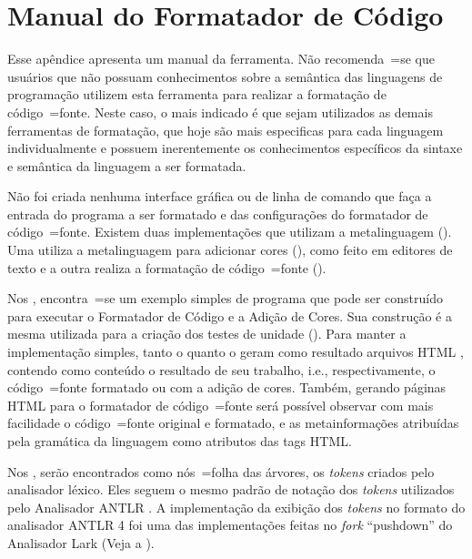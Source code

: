 

\chapter[Manual do Formatador]{Manual do Formatador de Código}
\label{chapter:manualDoFormatadorDeCodigo}

Esse apêndice apresenta um manual da ferramenta.
Não recomenda~=se que usuários que não possuam conhecimentos sobre a semântica das linguagens de programação\advisor{}{,
} utilizem esta ferramenta para realizar a formatação de código~=fonte.
Neste caso,
o mais indicado é que sejam utilizados as demais ferramentas de formatação,
que hoje são mais especificas para cada linguagem individualmente e
possuem inerentemente os conhecimentos específicos da sintaxe e
semântica da linguagem a ser formatada.

Não foi criada nenhuma interface gráfica ou
de linha de comando que faça a entrada do programa a ser formatado e
das configurações do formatador de código~=fonte.
Existem duas implementações que utilizam a metalinguagem ().
Uma utiliza a metalinguagem para adicionar cores (),
como feito em editores de texto e
a outra realiza a formatação de código~=fonte ().

Nos ,
encontra~=se um exemplo simples de programa que pode ser construído para executar o Formatador de Código e
a Adição de Cores.
Sua construção é a mesma utilizada para a criação dos testes de unidade ().
Para manter a implementação simples,
tanto o  quanto o  geram como resultado arquivos HTML \cite{parallelParserForHTML},
contendo como conteúdo o resultado de seu trabalho,
i.e., respectivamente,
o código~=fonte formatado ou
com a adição de cores.
Também,
gerando páginas HTML para o formatador de código~=fonte será possível observar com mais facilidade o código~=fonte original e
formatado,
e as metainformações atribuídas pela gramática da linguagem como atributos das tags HTML.

Nos ,
serão encontrados como nós~=folha das árvores,
os \textit{tokens} criados pelo analisador léxico.
Eles seguem o mesmo padrão de notação dos \textit{tokens} utilizados pelo Analisador ANTLR \cite{antlrBookTerrentParr}.
A implementação da exibição dos \textit{tokens} no formato do analisador ANTLR 4 foi uma das implementações feitas no \textit{fork} ``pushdown'' do Analisador Lark (Veja a ).

